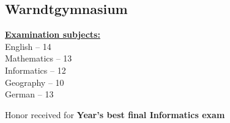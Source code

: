 \documentclass[]{jonas-cv}
\begin{document}
\begin{minipage}[t]{0.33\textwidth}
\subsection{Warndtgymnasium}

\begin{tightemize}
    \item \textbf{\underline{Examination subjects:}}\\
             English -- 14 \\
             Mathematics -- 13\\
             Informatics -- 12\\
             Geography -- 10\\
             German -- 13
    \item Honor received for \textbf{Year's best final Informatics exam}
\end{tightemize}
\largesectionsep
\vspace{-0.5mm}

%
%

\end{minipage} 
\hspace{1.5mm}
\vrule %
\hspace{1.5mm}
\end{document}

